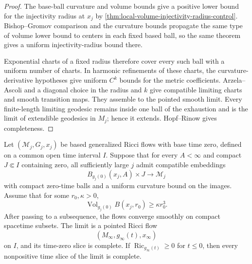 \begin{proof}
The base-ball curvature and volume bounds give a positive lower bound for
the injectivity radius at $x_j$ by
\ref{thm:local-volume-injectivity-radius-control}.  Bishop--Gromov comparison
and the curvature bounds propagate the same type of volume lower bound to
centers in each fixed based ball, so the same theorem gives a uniform
injectivity-radius bound there.

Exponential charts of a fixed radius therefore cover every such ball with a
uniform number of charts.  In harmonic refinements of these charts, the
curvature-derivative hypotheses give uniform $C^k$ bounds for the metric
coefficients.  Arzela--Ascoli and a diagonal choice in the radius and $k$
give compatible limiting charts and smooth transition maps.  They assemble
to the pointed smooth limit.  Every finite-length limiting geodesic remains
inside one ball of the exhaustion and is the limit of extendible geodesics
in $M_j$; hence it extends.  Hopf--Rinow gives completeness.
\end{proof}

\begin{theorem}
\label{thm:hamilton-compactness-generalized-flows}
\notready
Let $(\mathcal M_j,G_j,x_j)$ be based generalized Ricci flows with base time
zero, defined on a common open time interval $I$.  Suppose that for every
$A<\infty$ and compact $J\Subset I$ containing zero, all sufficiently large
$j$ admit compatible embeddings
\[
 B_{g_j(0)}(x_j,A)\times J\longrightarrow\mathcal M_j
\]
with compact zero-time balls and a uniform curvature bound on the images.
Assume that for some $r_0,\kappa>0$,
\[
 \operatorname{Vol}_{g_j(0)}B(x_j,r_0)\ge\kappa r_0^3.
\]
After passing to a subsequence, the flows converge smoothly on compact
spacetime subsets.  The limit is a pointed Ricci flow
\[
 (M_\infty,g_\infty(t),x_\infty)
\]
on $I$, and its time-zero slice is complete.  If
$\operatorname{Ric}_{g_\infty(t)}\ge0$ for $t\le0$, then every nonpositive
time slice of the limit is complete.
\end{theorem}

